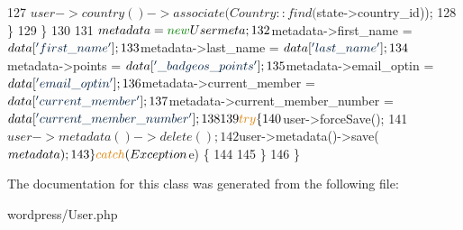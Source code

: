 \begin{DoxyCode}
127                 $user->country()->associate(Country::find($state->country\_id));
128             \}
129         \}
130 
131         $metadata                           = \textcolor{keyword}{new} Usermeta;
132         $metadata->first\_name               = $data[\textcolor{stringliteral}{'first\_name'}];
133         $metadata->last\_name                = $data[\textcolor{stringliteral}{'last\_name'}];
134         $metadata->points                   = $data[\textcolor{stringliteral}{'\_badgeos\_points'}];
135         $metadata->email\_optin              = $data[\textcolor{stringliteral}{'email\_optin'}];
136         $metadata->current\_member           = $data[\textcolor{stringliteral}{'current\_member'}];
137         $metadata->current\_member\_number    = $data[\textcolor{stringliteral}{'current\_member\_number'}];
138 
139         \textcolor{keywordflow}{try} \{
140             $user->forceSave();
141             $user->metadata()->delete();
142             $user->metadata()->save($metadata);
143         \} \textcolor{keywordflow}{catch}(Exception $e) \{
144 
145         \}
146     \}
\end{DoxyCode}


The documentation for this class was generated from the following file\-:\begin{DoxyCompactItemize}
\item 
wordpress/User.\-php\end{DoxyCompactItemize}
